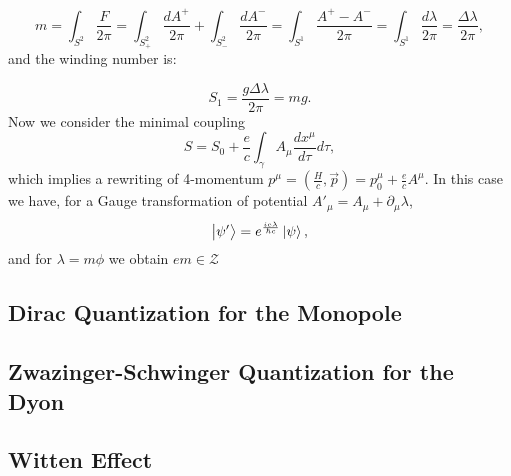 \begin{equation}
m=\int_{S^2}\frac{F}{2\pi}=\int_{S^2_+}\frac{dA^+}{2\pi}+\int_{S^2_-}\frac{dA^-}{2\pi}=\int_{S^1}\frac{A^+-A^-}{2\pi}=\int_{S^1}\frac{d\lambda}{2\pi}=\frac{\Delta\lambda}{2\pi},
\end{equation}
and the winding number is:

\begin{equation}
S_1=\frac{g\Delta\lambda}{2\pi}=mg.
\end{equation}
Now we consider the minimal coupling
\begin{equation}
S=S_0+\frac{e}{c}\int_{\gamma}A_{\mu}\frac{dx^{\mu}}{d\tau}d\tau,
\end{equation}
which implies a rewriting of 4-momentum $p^{\mu}=\left(\frac{H}{c},\vec p\right)=p_0^{\mu}+\frac{e}{c}A^{\mu}$.
In this case we have, for a Gauge transformation of potential $A'_{\mu}=A_{\mu}+\partial_{\mu}\lambda$,
\begin{equation}
\ket{\psi'}=e^{\frac{ie\lambda}{\hbar c}}\ket{\psi},
\end{equation}
and for $\lambda=m\phi$ we obtain $em\in \mathcal{Z}$

\subsection{Dirac Quantization for the Monopole}
\subsection{Zwazinger-Schwinger Quantization for the Dyon}
\subsection{Witten Effect}

